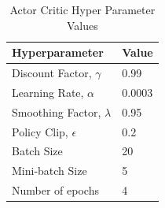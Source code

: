 \documentclass{article}
\begin{document}
  \begin{table}[!ht]
    \centering
    \begin{tabular}{|l|l|}
      \hline
    \textbf{Hyperparameter}             & \textbf{Value}  \\ \hline
    Discount Factor, $\gamma$           & 0.99            \\ \hline
    Learning Rate, $\alpha$             & 0.0003          \\ \hline
    Smoothing Factor, $\lambda$         & 0.95            \\ \hline
    Policy Clip, $\epsilon$             & 0.2             \\ \hline
    Batch Size                          & 20              \\ \hline
    Mini-batch Size                     & 5               \\ \hline
    Number of epochs                    & 4               \\ \hline
    \end{tabular}
    \caption{Actor Critic Hyper Parameter Values}
    \label{tab:PPOHYPER}
  \end{table}
\end{document}
